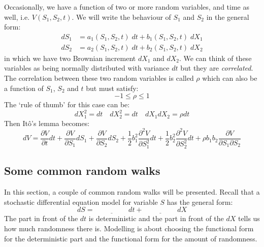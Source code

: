 Occasionally, we have a function of two or more random variables, and time as well, i.e. $V(S_1,S_2,t)$. We will write the behaviour of $S_1$ and $S_2$ in the general form:
\begin{align}
    dS_1 &= a_1(S_1,S_2,t) \; dt + b_1(S_1,S_2,t) \; dX_1 \\
    dS_2 &= a_2(S_1,S_2,t) \; dt + b_2(S_1,S_2,t) \; dX_2
\end{align}
in which we have two Brownian increment $dX_1$ and $dX_2$. We can think of these variables as being normally distributed with variance $dt$ but they are \textit{correlated}. The correlation between these two random variables is called $\rho$ which can also be a function of $S_1$, $S_2$ and $t$ but must satisfy:
\begin{equation}
    -1 \leq \rho \leq 1
\end{equation} 
The `rule of thumb' for this case can be:
\begin{equation}
    dX_1^2 = dt \quad dX_2^2 = dt \quad dX_1 dX_2 = \rho dt
\end{equation}
Then Itô's lemma becomes:
\begin{equation}
    dV = \frac{\partial V}{\partial t} dt + \frac{\partial V}{\partial S_1} dS_1 + \frac{\partial V}{\partial S_2} dS_2 + \frac{1}{2} b_1^2 \frac{\partial^2 V}{\partial S_1^2} dt + \frac{1}{2} b_2^2 \frac{\partial^2 V}{\partial S_2^2} dt + \rho b_1 b_2 \frac{\partial V}{\partial S_1 \partial S_2}
\end{equation}



\subsection{Some common random walks}
In this section, a couple of common random walks will be presented. Recall that a stochastic differential equation model for variable $S$ has the general form:
\begin{equation}
    dS = \underline{\hspace{2cm}} dt + \underline{\hspace{2cm}} dX
\end{equation}
The part in front of the $dt$ is deterministic and the part in front of the $dX$ tells us how much randomness there is. Modelling is about choosing the functional form for the deterministic part and the functional form for the amount of randomness.


